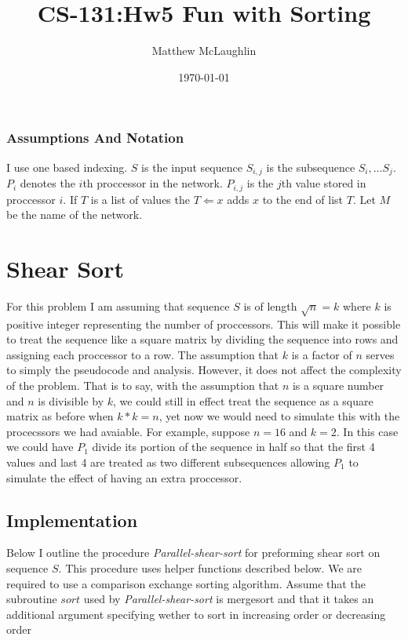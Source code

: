 \documentclass[12pt]{article}
\title{CS-131:Hw5 Fun with Sorting}
\author{Matthew McLaughlin}
\date{\today}
\begin{document}
\maketitle
\tableofcontents

\subsubsection*{Assumptions And Notation}
I use one based indexing. $S$ is the input sequence
$S_{i,j}$ is the subsequence $S_i, \dots S_j$.
$P_i$ denotes the $i$th proccessor in the network.
$P_{i,j}$ is the $j$th value stored in proccessor $i$.
If $T$ is a list of values the $T \Leftarrow x$ adds $x$ to the end
of list $T$.
Let $M$ be the name of the network. 

\newpage

\section{Shear Sort}
For this problem I am assuming that sequence $S$ is of 
length $\sqrt{n} = k$ where $k$ is positive integer
representing the number of proccessors. 
This will make it possible to treat the sequence
like a square matrix by dividing the sequence into rows and assigning each proccessor to
a row. The assumption that $k$ is a factor of $n$ serves to simply the 
pseudocode and analysis. However, it does not affect the complexity of the problem. 
That is to say, with the assumption that $n$ is a square number and $n$ is divisible by $k$,
we could still in effect treat the sequence as a square matrix as before when $k*k = n$, yet
now we would need to simulate this with the procecssors we had avaiable. For example,
suppose $n=16$ and $k=2$. In this case we could have $P_1$ divide its portion of the 
sequence in half so that the first 4 values and last 4 are treated as two different subsequences
allowing $P_1$ to simulate the effect of having an extra proccessor.   

\subsection{Implementation}
Below I outline the procedure \textit{Parallel-shear-sort} for preforming shear sort
on sequence $S$. This procedure uses helper functions described below.
We are required to use a comparison exchange sorting algorithm. Assume
that the subroutine $\textit{sort}$ used by \textit{Parallel-shear-sort}
is mergesort and that it takes an additional argument specifying wether to sort
in increasing order or decreasing order \\
 
\end{document}
